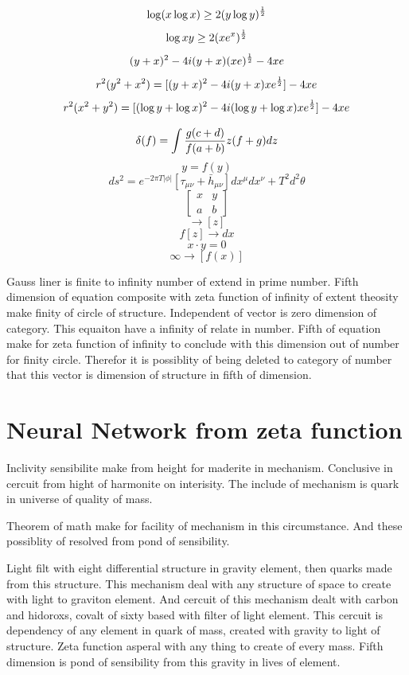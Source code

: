 \documentclass{jsarticle}
\begin{document}
$$ \log (x \log x) \ge 2(y \log y)^{1 \over 2} $$
$$ \log xy \ge 2(x e^{x})^{1 \over 2} $$
$$ (y + x)^2 -4i(y + x)(x e)^{1 \over 2} - 4xe $$
$$ r^2(y^2 + x^2) = [(y + x)^2 - 4i (y + x)xe^{1 \over 2}] -4xe $$
$$ r^2(x^2 + y^2) = [(\log y + \log x)^2 - 4i (\log y + \log x)xe^{1 \over 2}] - 4xe $$

$$ \delta(f) = \int {g(c + d) \over {f(a + b)}}z(f + g)dz $$
$$ y = f(y) $$
$$ ds^2 = e^{-2\pi T|\phi|}[\tau_{\mu\nu} + \bar{h}_{\mu\nu}]dx^{\mu}dx^{\nu} + T^2d^2\theta $$
$$ \begin{bmatrix} x & y  \\
   a & b 
   \end{bmatrix} $$
    $$ \to [z] $$
   $$ f[z] \to dx $$
   $$ x \cdot y = 0 $$
$$ \infty \to [f(x)] $$

 Gauss liner is finite to infinity number of extend in prime number.
 Fifth dimension of equation composite with zeta function of infinity of extent theosity make 
finity of circle of structure.
Independent of vector is zero dimension of category. This equaiton have a infinity of relate in number.
Fifth of equation make for zeta function of infinity to conclude with this dimension out of number for finity circle.
Therefor it is possiblity of being deleted to category of number that this vector is dimension of structure in fifth
of dimension.




\section{Neural Network from zeta function}
  Inclivity sensibilite make from height for maderite in mechanism.
Conclusive in cercuit from hight of harmonite on interisity.
The include of mechanism is quark in universe of quality of mass.

  Theorem of math make for facility of mechanism in this circumstance. 
And these possiblity of resolved from pond of sensibility.

  Light filt with eight differential structure in gravity element, then quarks made from this structure.
This mechanism deal with any structure of space to create with light to graviton element.
And cercuit of this mechanism dealt with carbon and hidoroxs, covalt of sixty based with filter of light element.
This cercuit is dependency of any element in quark of mass, created with gravity to light of structure.
Zeta function asperal with any thing to create of every mass.
Fifth dimension is pond of sensibility from this gravity in lives of element.
\end{document}
